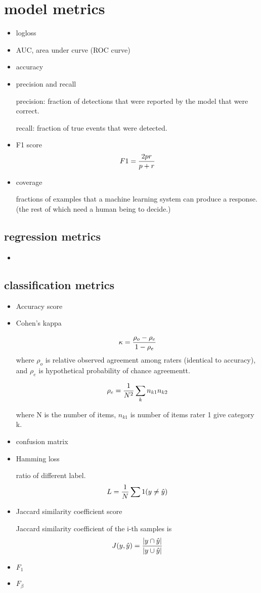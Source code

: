 \documentclass[10pt,a4paper]{book}
\begin{document}
\section {model metrics}
\begin{itemize}
	\item logloss
	\item AUC, area under curve (ROC curve)
	\item accuracy
	\item precision and recall
	
	precision: fraction of detections that were reported by the model that were correct.
	
	recall: fraction of true events that were detected.
	
	\item F1 score 
	$$ F1 = {2pr\over {p+r}} $$
	\item coverage
	
	fractions of examples that a machine learning system can produce a response. (the rest of which need a human being to decide.)
\end{itemize}

\subsection{regression metrics}
\begin{itemize}
	\item 
\end{itemize}
\subsection{classification metrics}
\begin{itemize}
	\item Accuracy score
	\item Cohen's kappa
	
	$$ \kappa = {{\rho_o - \rho_e} \over {1 - \rho_e}}$$
	where $\rho_o$ is relative observed agreement among raters (identical to accuracy), and $\rho_e$ is hypothetical probability of chance agreementt.
	
	$$\rho_e = {1\over N^2 }\sum_k n_{k1} n_{k2}$$
	
	where N is the number of items, $n_{k1}$ is number of items rater 1 give category k.
	
	\item confusion matrix
	\item Hamming loss
	
	ratio of different label.
	$$L = {1\over N}\sum 1(y \neq \hat{y}) $$
	
	\item Jaccard similarity coefficient score
	
	Jaccard similarity coefficient of the i-th samples is
	$$J(y,\hat{y}) = { { |y \cap \hat{y} | } \over {|y \cup \hat{y}|}}$$
	
	\item $F_1$
	\item $F_{\beta}$
	
\end{itemize}
\end{document}
